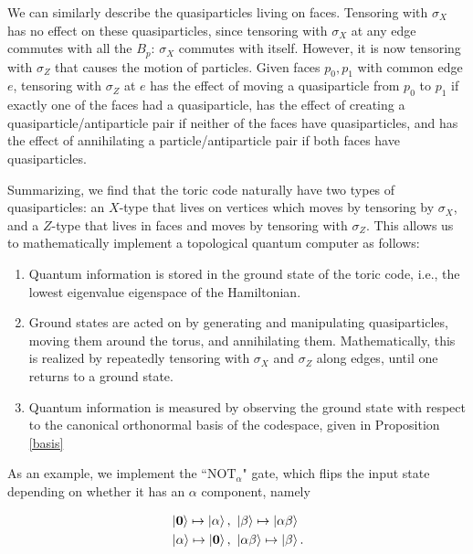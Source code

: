 \documentclass{article}
\theoremstyle{definition}
\numberwithin{figure}{section}
\begin{document}
We can similarly describe the quasiparticles living on faces. Tensoring with $\sigma_X$ has no effect on these quasiparticles, since tensoring with $\sigma_X$ at any edge commutes with all the $B_p$: $\sigma_X$ commutes with itself. However, it is now tensoring with $\sigma_Z$ that causes the motion of particles. Given faces $p_0,p_1$ with common edge $e$, tensoring with $\sigma_Z$ at $e$ has the effect of moving a quasiparticle from $p_0$ to $p_1$ if exactly one of the faces had a quasiparticle, has the effect of creating a quasiparticle/antiparticle pair if neither of the faces have quasiparticles, and has the effect of annihilating a particle/antiparticle pair if both faces have quasiparticles.

Summarizing, we find that the toric code naturally have two types of quasiparticles: an $X$-type that lives on vertices which moves by tensoring by $\sigma_X$, and a $Z$-type that lives in faces and moves by tensoring with $\sigma_Z$. This allows us to mathematically implement a topological quantum computer as follows:

\begin{enumerate}
\item Quantum information is stored in the ground state of the toric code, i.e., the lowest eigenvalue eigenspace of the Hamiltonian.
\item Ground states are acted on by generating and manipulating quasiparticles, moving them around the torus, and annihilating them. Mathematically, this is realized by repeatedly tensoring with $\sigma_X$ and $\sigma_Z$ along edges, until one returns to a ground state.
\item Quantum information is measured by observing the ground state with respect to the canonical orthonormal basis of the codespace, given in Proposition \ref{basis}
\end{enumerate}


As an example, we implement the ``$\text{NOT}_\alpha$" gate, which flips the input state depending on whether it has an $\alpha$ component, namely

\begin{align*}
&\left|\bold{0}\right> \mapsto \left|\alpha\right>,\,\, \left|\beta\right> \mapsto \left|\alpha\beta\right> \\
&\left|\alpha\right> \mapsto \left|\bold{0}\right>,\,\, \left|\alpha\beta\right> \mapsto \left|\beta\right>.
\end{align*}
\end{document}
